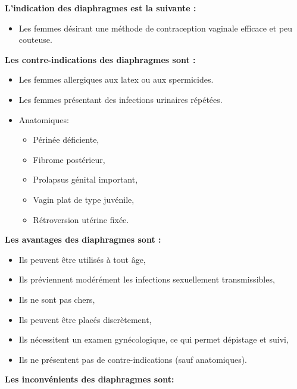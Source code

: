 \noindent \textbf{L’indication des diaphragmes est la suivante :}

\begin{itemize}[label={$\bullet$}, align=right]
\item  Les femmes désirant une méthode de contraception vaginale efficace et peu couteuse.
\end{itemize}\vspace*{1em}

\noindent \textbf{Les contre-indications des diaphragmes sont :}
\begin{itemize}[label={$\bullet$}, align=right]
  \item  Les femmes allergiques aux latex ou aux spermicides. 
  \item  Les femmes présentant des infections urinaires répétées. 
  \item	Anatomiques: 
  \begin{itemize}[label={$\circ$}]
    \item Périnée déficiente, 
    \item Fibrome postérieur, 
    \item Prolapsus génital important, 
    \item	Vagin plat de type juvénile, 
    \item	Rétroversion utérine fixée. 
  \end{itemize}
\end{itemize}\vspace*{1em}

\noindent \textbf{Les avantages des diaphragmes sont :}

\begin{itemize}[label={$\bullet$}, align=right]
  \item Ils peuvent être utilisés à tout âge, 
  \item	Ils préviennent modérément les infections sexuellement transmissibles,
  \item	Ils ne sont pas chers, 
  \item	Ils peuvent être placés discrètement, 
  \item Ils nécessitent un examen gynécologique, ce qui permet dépistage et suivi, 
  \item	Ils ne présentent pas de contre-indications (sauf anatomiques).
\end{itemize}\vspace*{1em}

\noindent \textbf{Les inconvénients des diaphragmes sont:}


